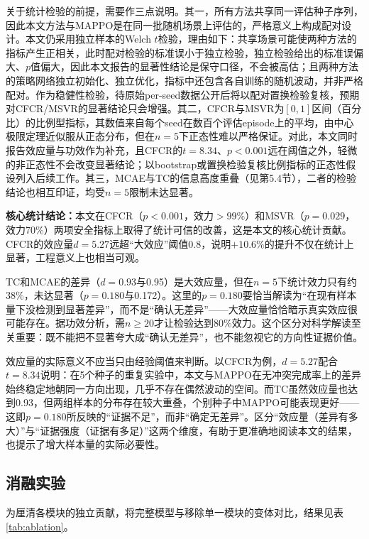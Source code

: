\documentclass[12pt,a4paper,UTF8]{ctexart}
\begin{document}
关于统计检验的前提，需要作三点说明。其一，所有方法共享同一评估种子序列，因此本文方法与MAPPO是在同一批随机场景上评估的，严格意义上构成配对设计。本文仍采用独立样本的Welch $t$检验，理由如下：共享场景可能使两种方法的指标产生正相关，此时配对检验的标准误小于独立检验，独立检验给出的标准误偏大、$p$值偏大，因此本文报告的显著性结论是保守口径，不会被高估；且两种方法的策略网络独立初始化、独立优化，指标中还包含各自训练的随机波动，并非严格配对。作为稳健性检验，待原始per-seed数据公开后将以配对置换检验复核，预期对CFCR/MSVR的显著结论只会增强。其二，CFCR与MSVR为$[0,1]$区间（百分比）的比例型指标，其数值来自每个seed在数百个评估episode上的平均，由中心极限定理近似服从正态分布，但在$n=5$下正态性难以严格保证。对此，本文同时报告效应量与功效作为补充，且CFCR的$t=8.34$、$p<0.001$远在阈值之外，轻微的非正态性不会改变显著结论；以bootstrap或置换检验复核比例指标的正态性假设列入后续工作。其三，MCAE与TC的信息高度重叠（见第5.4节），二者的检验结论也相互印证，均受$n=5$限制未达显著。

\textbf{核心统计结论：}本文在CFCR（$p<0.001$，效力$>99\%$）和MSVR（$p=0.029$，效力70\%）两项安全指标上取得了统计可信的改善，这是本文的核心统计贡献。CFCR的效应量$d=5.27$远超“大效应”阈值0.8，说明$+10.6\%$的提升不仅在统计上显著，工程意义上也相当可观。

TC和MCAE的差异（$d=0.93$与0.95）是大效应量，但在$n=5$下统计效力只有约38\%，未达显著（$p=0.180$与0.172）。这里的$p=0.180$要恰当解读为“在现有样本量下没检测到显著差异”，而不是“确认无差异”——大效应量恰恰暗示真实效应很可能存在。据功效分析，需$n\geq20$才让检验达到80\%效力。这个区分对科学解读至关重要：既不能把不显著夸大成“确认无差异”，也不能忽视它的方向性证据价值。

效应量的实际意义不应当只由经验阈值来判断。以CFCR为例，$d=5.27$配合$t=8.34$说明：在5个种子的重复实验中，本文与MAPPO在无冲突完成率上的差异始终稳定地朝同一方向出现，几乎不存在偶然波动的空间。而TC虽然效应量也达到0.93，但两组样本的分布存在较大重叠，个别种子中MAPPO可能表现更好——这即$p=0.180$所反映的“证据不足”，而非“确定无差异”。区分“效应量（差异有多大）”与“证据强度（证据有多足）”这两个维度，有助于更准确地阅读本文的结果，也提示了增大样本量的实际必要性。

\subsection{消融实验}

为厘清各模块的独立贡献，将完整模型与移除单一模块的变体对比，结果见表\ref{tab:ablation}。
\end{document}
